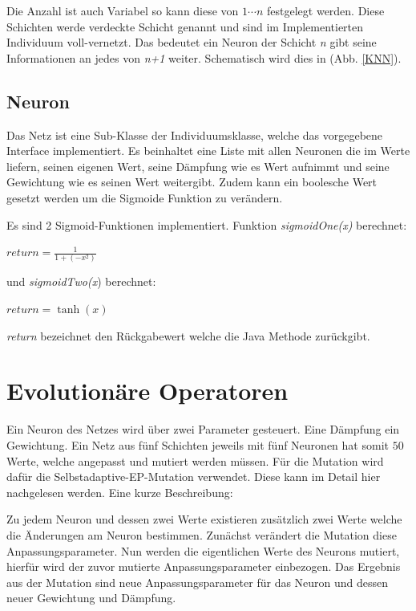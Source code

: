 Die Anzahl ist auch Variabel so kann diese von $1 \cdots n$ festgelegt werden. Diese Schichten werde verdeckte Schicht genannt und sind im Implementierten Individuum voll-vernetzt. Das bedeutet ein Neuron der Schicht \textit{n} gibt seine Informationen an jedes von \textit{n+1} weiter. Schematisch wird dies in (Abb. \ref{KNN}).

\subsection{Neuron}
Das Netz ist eine Sub-Klasse der Individuumsklasse, welche das vorgegebene Interface implementiert. Es beinhaltet eine Liste mit allen Neuronen die im Werte liefern, seinen eigenen Wert, seine Dämpfung wie es Wert aufnimmt und seine Gewichtung wie es seinen Wert weitergibt. Zudem kann ein boolesche Wert gesetzt werden um die Sigmoide Funktion zu verändern.

Es sind 2 Sigmoid-Funktionen implementiert. Funktion \textit{sigmoidOne(x)} berechnet:
\begin{center}$
return = \frac{1}{1+ (-x^{2})}
$\end{center}


und \textit{sigmoidTwo(x}) berechnet:

\begin{center}$
return = \tanh (x)
$\end{center}

\textit{return} bezeichnet den Rückgabewert welche die Java Methode zurückgibt.

\section{Evolutionäre Operatoren}
Ein Neuron des Netzes wird über zwei Parameter gesteuert. Eine Dämpfung ein Gewichtung. Ein Netz aus fünf Schichten jeweils mit fünf Neuronen hat somit $50$ Werte, welche angepasst und mutiert werden müssen. Für die Mutation wird dafür die Selbstadaptive-EP-Mutation verwendet. Diese kann im Detail hier \citep[S.146]{Weicker2007} nachgelesen werden. Eine kurze Beschreibung:

Zu jedem Neuron und dessen zwei Werte existieren zusätzlich zwei Werte welche die Änderungen am Neuron bestimmen. Zunächst verändert die Mutation diese Anpassungsparameter. Nun werden die eigentlichen Werte des Neurons mutiert, hierfür wird der zuvor mutierte Anpassungsparameter einbezogen. Das Ergebnis aus der Mutation sind neue Anpassungsparameter für das Neuron und dessen neuer Gewichtung und Dämpfung.

